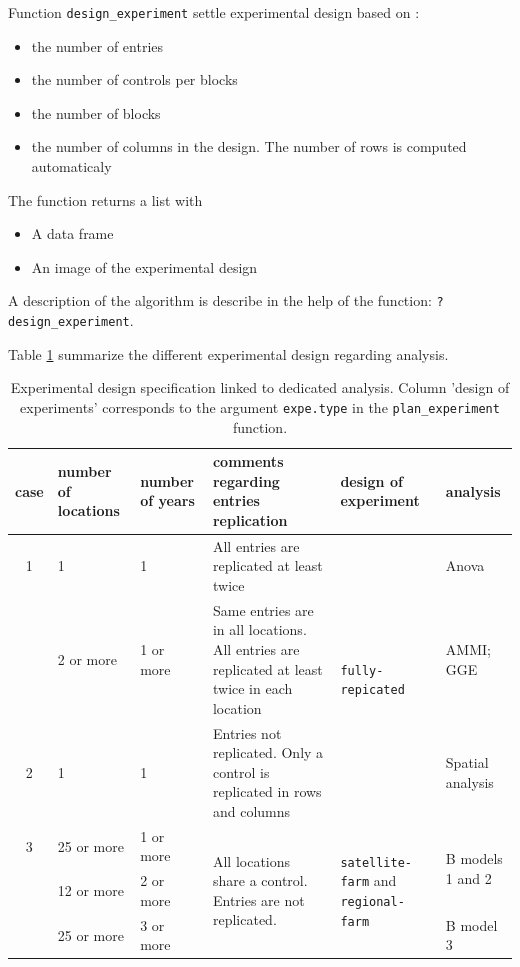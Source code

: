 \documentclass{article}\usepackage[]{graphicx}\usepackage[]{color}
\begin{document}
\noindent Function \texttt{design\_experiment} settle experimental design based on :
\begin{itemize} 
\item the number of entries
\item the number of controls per blocks
\item the number of blocks
\item the number of columns in the design. The number of rows is computed automaticaly
\end{itemize} 

\noindent The function returns a list with
\begin{itemize} 
\item A data frame
\item An image of the experimental design
\end{itemize} 

\noindent A description of the algorithm is describe in the help of the function: \texttt{?design\_experiment}.

\noindent Table \ref{cases_expe} summarize the different experimental design regarding analysis.

\begin{table}[H]
\begin{tabular}{
c
p{}
p{}
p{}
p{}
p{}
}
\hline
case & number of locations & number of years & comments regarding entries replication & design of experiment & analysis \\
\hline
1 & 1 & 1 & All entries are replicated at least twice & \multirow{3}{.2\textwidth}{\texttt{fully-repicated}} & Anova \\
\cline{2-4}\cline{6-6}
  & 2 or more & 1 or more & Same entries are in all locations. All entries are replicated at least twice in each location & & AMMI; GGE \\
\hline
2 & 1 & 1 & Entries not replicated. Only a control is replicated in rows and columns & \texttt{row-column} & Spatial analysis \\
\hline
3 & 25 or more & 1 or more & \multirow{3}{.35\textwidth}{All locations share a control. Entries are not replicated.} & \multirow{3}{.2\textwidth}{\texttt{satellite-farm} and \texttt{regional-farm}} & \multirow{2}{.1\textwidth}{B models 1 and 2} \\
  & 12 or more & 2 or more & & & \\
  \cline{2-3} \cline{6-6}
  & 25 or more & 3 or more & & & B model 3 \\
\hline
\end{tabular}
\caption{Experimental design specification linked to dedicated analysis. Column 'design of experiments' corresponds to the argument \texttt{expe.type} in the \texttt{plan\_experiment} function.}
\label{cases_expe}
\end{table}
\end{document}
